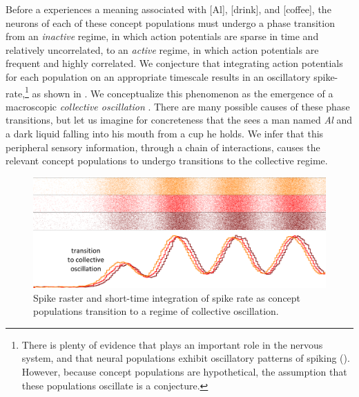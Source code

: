 Before a  experiences a meaning associated with [Al], [drink], and [coffee], the neurons of each of these concept populations must undergo a phase transition from an \textit{inactive} regime, in which action potentials are sparse in time and relatively uncorrelated, to an \textit{active} regime, in which action potentials are frequent and highly correlated. We conjecture that integrating action potentials for each population on an appropriate timescale results in an oscillatory spike-rate,\footnote{There is plenty of evidence that  plays an important role in the nervous system, and that neural populations exhibit oscillatory patterns of spiking (\citealt{AverbeckEtAl2003,Buzsaki2006,BuzsákiDraguhn2004,CanoltyKnight2010,EngelEtAl2001,Fuster2001,GerstnerKistler2002,Izhikevich2006,Izhikevich2007,IzhikevichEdelman2008,Klimesch1999}). However, because concept populations are hypothetical, the assumption that these populations oscillate is a conjecture.} as shown in {}. We conceptualize this phenomenon as the emergence of a macroscopic \textit{collective oscillation} \citep{AcebrónEtAl2005,BreakspearEtAl2010,HongStrogatz2011,Kelso1997,SchonerKelso1988,Strogatz2000,Winfree2001}. There are many possible causes of these phase transitions, but let us imagine for concreteness that the  sees a man named \textit{Al} and a dark liquid falling into his mouth from a cup he holds. We infer that this peripheral sensory information, through a chain of interactions, causes the relevant concept populations to undergo transitions to the collective  regime.


  
\begin{figure}
\includegraphics[width=\textwidth]{figures/Tilsen-img10.png}
\caption{Spike raster and short-time integration of spike rate as concept populations transition to a regime of collective oscillation.}
\label{fig:2:3}
\end{figure}
 

